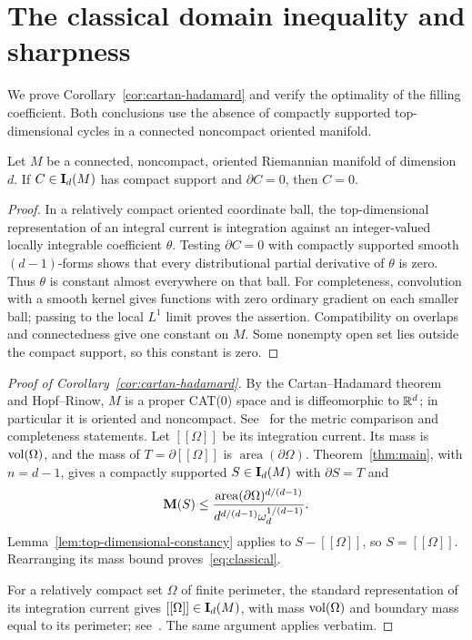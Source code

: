 \section{The classical domain inequality and sharpness}
\label{sec:classical}

We prove Corollary~\ref{cor:cartan-hadamard} and verify the optimality
of the filling coefficient. Both conclusions use the absence of
compactly supported top-dimensional cycles in a connected noncompact
oriented manifold.

\begin{lemma}\label{lem:top-dimensional-constancy}
Let $M$ be a connected, noncompact, oriented Riemannian manifold of
dimension $d$. If $C\in\mathbf I_d(M)$ has compact support and
$\partial C=0$, then $C=0$.
\end{lemma}

\begin{proof}
In a relatively compact oriented coordinate ball, the
top-dimensional representation of an integral current is integration
against an integer-valued locally integrable coefficient $\theta$.
Testing $\partial C=0$ with compactly supported smooth
$(d-1)$-forms shows that every distributional partial derivative of
$\theta$ is zero. Thus $\theta$ is constant almost everywhere on that
ball. For completeness, convolution with a smooth kernel gives
functions with zero ordinary gradient on each smaller ball; passing
to the local $L^1$ limit proves the assertion. Compatibility on
overlaps and connectedness give one constant on $M$. Some nonempty
open set lies outside the compact support, so this constant is zero.
\end{proof}

\begin{proof}[Proof of Corollary~\ref{cor:cartan-hadamard}]
By the Cartan--Hadamard theorem and Hopf--Rinow, $M$ is a proper
CAT(0) space and is diffeomorphic to $\mathbb R^d$; in particular it is
oriented and noncompact. See~\cite[Sections~I.3, II.1A and II.4]{BridsonHaefliger1999}
for the metric comparison and completeness statements.
Let $[[\Omega]]$ be its integration
current. Its mass is $\operatorname{vol}(\Omega)$, and the mass of
$T=\partial[[\Omega]]$ is $\operatorname{area}(\partial\Omega)$.
Theorem~\ref{thm:main}, with $n=d-1$, gives a compactly supported
$S\in\mathbf I_d(M)$ with $\partial S=T$ and
\[
 \mathbf M(S)\le
 \frac{\operatorname{area}(\partial\Omega)^{d/(d-1)}}
 {d^{d/(d-1)}\omega_d^{1/(d-1)}}.
\]
Lemma~\ref{lem:top-dimensional-constancy} applies to
$S-[[\Omega]]$, so $S=[[\Omega]]$. Rearranging its mass bound
proves~\eqref{eq:classical}.

For a relatively compact set $\Omega$ of finite perimeter, the
standard representation of its integration current gives
$[[\Omega]]\in\mathbf I_d(M)$, with mass $\operatorname{vol}(\Omega)$ and boundary
mass equal to its perimeter; see~\cite[Chapter~3, Section~4, Theorem~4.3;
Chapter~6, Section~3, Remark~3.15]{Simon2014}. The same
argument applies verbatim.
\end{proof}

